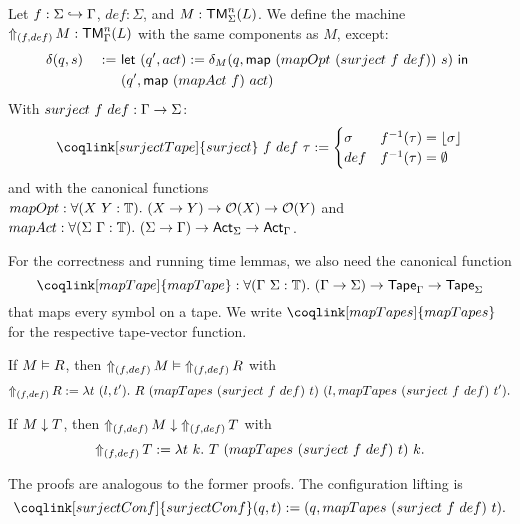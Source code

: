 \begin{definition}
  \label{def:LiftAlphabet}
  Let $f : \Sigma \hookrightarrow \Tau$, $def:\Sigma$, and $M : \TM_\Sigma^n(L)$.  We define the machine %
  $\LiftAlphabet{M}{(f,def)} : \TM_\Tau^n(L)$ with the same components as $M$, except:
  \begin{alignat*}{2}
    & \delta(q,s)    &~:=~& \Let{(q', act) := \delta_M(q, \map{(mapOpt~(surject~f~def))}{s})}{\\%
    &                &~  ~& (q', \map{(mapAct~f)}{act})} \\
  \end{alignat*}
  With $surject~f~def : \Tau \to \Sigma$:
  \[
    \coqlink[surjectTape]{surject}~f~def~\tau :=
    \begin{cases}
      \sigma & f^{-1}(\tau) = \Some{\sigma} \\
      def & f^{-1}(\tau) = \None
    \end{cases}
  \]
  and with the canonical functions $mapOpt: \forall (X~Y:\Type).~ (X \to Y) \to \Option(X) \to \Option(Y)$ and
  $mapAct : \forall (\Sigma~\Tau:\Type).~(\Sigma\to\Tau) \to \Act_\Sigma \to \Act_\Tau$.
\end{definition}

%
For the correctness and running time lemmas, we also need the canonical function
\[
  \coqlink[mapTape]{mapTape}:\forall (\Tau~\Sigma:\Type).~(\Tau\to\Sigma)\to\Tape_\Tau\to\Tape_\Sigma
\]
that maps every symbol on a tape.  We write $\coqlink[mapTapes]{mapTapes}$ for the respective tape-vector function.
%

\begin{lemma}
  \label{lem:LiftAlphabet_Realise}
  If $M \Realise R$, then $\LiftAlphabet{M}{(f,def)} \Realise \LiftAlphabet{R}{(f,def)}$ with
  \small
  \[
    \LiftAlphabet{R}{(f,def)} := \lambda t~(l, t').~R~(mapTapes~(surject~f~def)~t)~(l, mapTapes~(surject~f~def)~t').
  \]
\end{lemma}

\begin{lemma}
  \label{lem:LiftAlphabet_TerminatesIn}
  If $M \TerminatesIn T$, then $\LiftAlphabet{M}{(f,def)} \TerminatesIn \LiftAlphabet{T}{(f,def)}$ with
  \[
    \LiftAlphabet{T}{(f,def)} := \lambda t~k.~T~(mapTapes~(surject~f~def)~t)~k.
  \]
\end{lemma}

The proofs are analogous to the former proofs.  The configuration lifting is
\[
  \coqlink[surjectConf]{surjectConf} (q,t) := (q, mapTapes~(surject~f~def)~t).
\]



